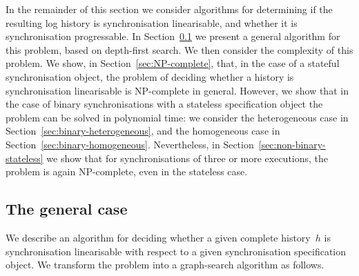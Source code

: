 In the remainder of this section we consider algorithms for determining if the
resulting log history is synchronisation linearisable, and whether it is
synchronisation progressable.  In Section~\ref{sec:algorithm-dfs} we present a
general algorithm for this problem, based on depth-first search.  We then
consider the complexity of this problem.  We show, in
Section~\ref{sec:NP-complete}, that, in the case of a stateful synchronisation
object, the problem of deciding whether a history is synchronisation
linearisable is NP-complete in general.  However, we show that in the case of
binary synchronisations with a stateless specification object the problem can
be solved in polynomial time: we consider the heterogeneous case in
Section~\ref{sec:binary-heterogeneous}, and the homogeneous case in
Section~\ref{sec:binary-homogeneous}.  Nevertheless, in
Section~\ref{sec:non-binary-stateless} we show that for synchronisations of
three or more executions, the problem is again NP-complete, even in the
stateless case.



\subsection{The general case}
\label{sec:algorithm-dfs}

We describe an algorithm for deciding whether a given complete history~$h$ is
synchronisation linearisable with respect to a given synchronisation
specification object.  We transform the problem into a graph-search algorithm
as follows.

